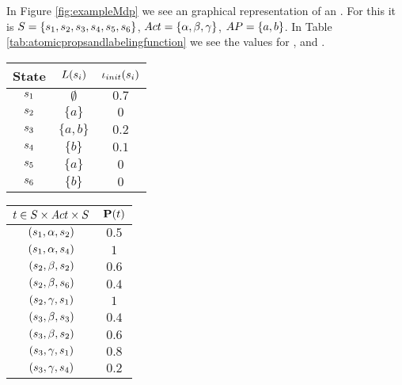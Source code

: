 \documentclass[preview]{standalone}
\begin{document}
\begin{exmp}
In Figure \ref{fig:exampleMdp} we see an graphical representation of an \mdpN. For this \mdpN it is ${S} = \{{s}_1, {s}_2, {s}_3, {s}_4, {s}_5, {s}_6\}$, ${Act} = \{{\alpha}, {\beta}, {\gamma}\}$, ${AP} = \{a,b\}$. In Table \ref{tab:atomicpropsandlabelingfunction} we see the values for , \initdistrib and \trans.

\begin{table}[h!]
	\parbox{.45\linewidth}{
		\begin{center}
%			
			\begin{tabular}{c|c|c} %
				State & ${L}({s}_i)$ & ${\iota_{init}}({s}_i)$\\		
				\hline
				${s}_1$ & $\emptyset$ & $0.7$\\
				${s}_2$ & $\{a\}$ & $0$\\
				${s}_3$ & $\{a,b\}$ & $0.2$\\
				${s}_4$ & $\{b\}$ & $0.1$\\
				${s}_5$ & $\{a\}$ & $0$\\
				${s}_6$ & $\{b\}$ & $0$\\			
			\end{tabular}
		\end{center}
}
\parbox{.45\linewidth}{
		\begin{center}
			\begin{tabular}{c|c} %
				$t \in {S} \times {Act} \times {S}$ & ${{\textbf{P}}}(t)$\\		
				\hline
				$({s}_1,{\alpha}, {s}_2)$ & $0.5$\\
				$({s}_1,{\alpha}, {s}_4)$ & $1$\\
				$({s}_2,{\beta}, {s}_2)$ & $0.6$\\
				$({s}_2,{\beta}, {s}_6)$ & $0.4$\\
				$({s}_2,{\gamma}, {s}_1)$ & $1$\\
				$({s}_3,{\beta}, {s}_3)$ & $0.4$\\
				$({s}_3,{\beta}, {s}_2)$ & $0.6$\\
				$({s}_3,{\gamma}, {s}_1)$ & $0.8$\\
				$({s}_3,{\gamma}, {s}_4)$ & $0.2$\\

\end{tabular}
\end{center}}
\end{table}
\end{exmp}
\end{document}
